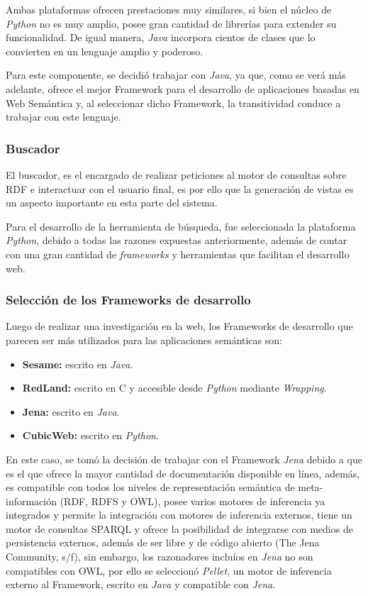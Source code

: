 Ambas plataformas ofrecen prestaciones muy similares, si bien el núcleo de \textit{Python} no es muy amplio, posee gran cantidad de librerías para extender su funcionalidad. De igual manera, \textit{Java} incorpora cientos de clases que lo convierten en un lenguaje amplio y poderoso.

Para este componente, se decidió trabajar con \textit{Java}, ya que, como se verá más adelante, ofrece el mejor Framework para el desarrollo de aplicaciones basadas en Web Semántica y, al seleccionar dicho Framework, la transitividad conduce a trabajar con este lenguaje.

\subsubsection{Buscador}
El buscador, es el encargado de realizar peticiones al motor de consultas sobre RDF e interactuar con el usuario final, es por ello que la generación de vistas es un aspecto importante en esta parte del sistema.

Para el desarrollo de la herramienta de búsqueda, fue seleccionada la plataforma \textit{Python}, debido a todas las razones expuestas anteriormente, además de contar con una gran cantidad de \textit{frameworks} y herramientas que facilitan el desarrollo web.

\subsubsection{Selección de los Frameworks de desarrollo}
Luego de realizar una investigación en la web, los Frameworks de desarrollo que parecen ser más utilizados para las aplicaciones semánticas son:

\begin{itemize}
    \item \textbf{Sesame:} escrito en \textit{Java}.
    \item \textbf{RedLand:} escrito en C y accesible desde \textit{Python} mediante \textit{Wrapping}.
    \item \textbf{Jena:} escrito en \textit{Java}.
    \item \textbf{CubicWeb:} escrito en \textit{Python}.
\end{itemize}

En este caso, se tomó la decisión de trabajar con el Framework \textit{Jena} debido a que es el que ofrece la mayor cantidad de documentación disponible en línea, además, es compatible con todos los niveles de representación semántica de meta-información (RDF, RDFS y OWL), posee varios motores de inferencia ya integrados y permite la integración con motores de inferencia externos, tiene un motor de consultas SPARQL y ofrece la posibilidad de integrarse con medios de persistencia externos, además de ser libre y de código abierto (The Jena Community, s/f), sin embargo, los razonadores incluíos en \textit{Jena} no son compatibles con OWL, por ello se seleccionó \textit{Pellet}, un motor de inferencia externo al Framework, escrito en \textit{Java} y compatible con \textit{Jena}.

